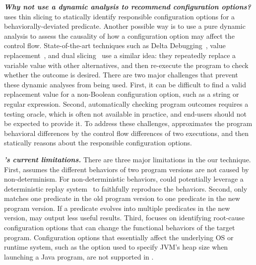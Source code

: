 \vspace{1mm}
\noindent \textbf{\textit{Why not use a dynamic analysis to recommend
configuration options?}}
\ourtool uses thin slicing to statically identify responsible configuration
options for a behaviorally-deviated predicate. Another possible way is to use a pure
dynamic analysis to assess the causality of how a configuration option
may affect the control flow. State-of-the-art
techniques such as Delta Debugging~\cite{dd}, value replacement~\cite{failuredoc},
and dual slicing~\cite{Sumner:2013:CCE}
use a similar idea: they repeatedly replace a variable value with other alternatives,
and then re-execute the program to check whether the outcome is desired.
There are two major challenges that prevent these dynamic analyses
from being used. First, it can be
difficult to find a valid replacement value for a non-Boolean
configuration option, such as a string or regular expression.
Second, automatically checking program outcomes requires
a testing oracle, which is often not available in practice, and end-users
should not be  expected to provide it. To address these challenges,
\ourtool approximates the program behavioral differences by the
control flow differences of two executions, and then statically reasons
about the responsible configuration options.



\vspace{1mm}
\noindent \textbf{\textit{\ourtool's current limitations.}}
There are three major limitations in the our \ourtool technique.
First, \ourtool assumes the different behaviors
of two program versions are not caused by non-determinism.
For non-deterministic behaviors, \ourtool
could potentially leverage a deterministic replay
system~\cite{Huang:2013:CRL, Jin:2012:BRF} to faithfully reproduce the behaviors.
Second, \ourtool only matches one predicate in the old
program version to one predicate in the new program version.
If a predicate evolves into multiple predicates in the new
version, \ourtool may output less useful results. 
Third, \ourtool focuses on identifying root-cause
configuration options that can change the functional behaviors of
the target program.
Configuration options that essentially affect the underlying
OS or runtime system, such as the  option used to
specify JVM's heap size when launching a Java program,
are not supported in \ourtool.

